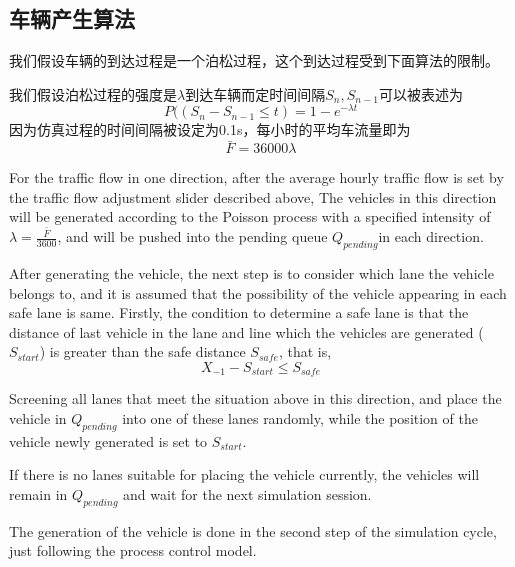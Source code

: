 \documentclass[a4paper,UTF8]{paper}
\begin{document}
\subsection{车辆产生算法}
我们假设车辆的到达过程是一个泊松过程，这个到达过程受到下面算法的限制。

我们假设泊松过程的强度是$\lambda$到达车辆而定时间间隔$S_n,S_{n-1}$可以被表述为 
$$P((S_n-S_{n-1}\le t) = 1 - e^{-\lambda t}$$
因为仿真过程的时间间隔被设定为0.1s，每小时的平均车流量即为$$\bar{F}=36000\lambda$$


For the traffic flow in one direction, after the average hourly traffic flow is set by the traffic flow adjustment slider described above, The vehicles in this direction will be generated according to the Poisson process with a specified intensity of $\lambda=\displaystyle{\frac{\bar{F}}{3600}}$, and will be pushed into the pending queue $Q_{pending}$in each direction.

After generating the vehicle, the next step is to consider which lane the vehicle belongs to, and it is assumed that the possibility of the vehicle appearing in each safe lane is same. Firstly, the condition to determine a safe lane is that the distance of last vehicle in the lane and line which the vehicles are generated ($S_{start}$) is greater than the safe distance $S_{safe}$, that is,
$$X_{-1}-S_{start}\le S_{safe}$$

Screening all lanes that meet the situation above in this direction, and place the vehicle in $Q_{pending}$ into one of these lanes randomly, while the position of the vehicle newly generated is set to $S_{start}$.

If there is no lanes suitable for placing the vehicle currently, the vehicles will remain in $Q_{pending}$ and wait for the next simulation session.

The generation of the vehicle is done in the second step of the simulation cycle, just following the process control model.
\end{document}

